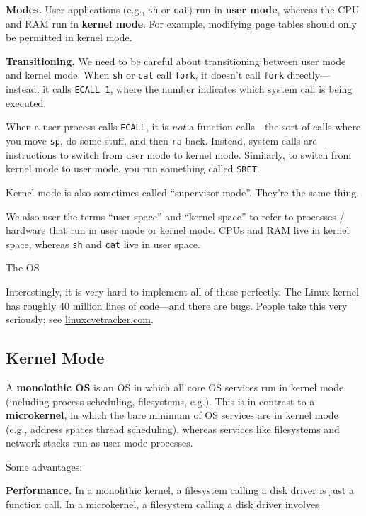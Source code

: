 \textbf{Modes.}
User applications (e.g., \verb|sh| or \verb|cat|) run in \textbf{user mode},
whereas the CPU and RAM run in \textbf{kernel mode}.
For example, modifying page tables should only be permitted in kernel mode.

\textbf{Transitioning.}
We need to be careful about transitioning between user mode and kernel mode.
When \verb|sh| or \verb|cat| call \verb|fork|,
it doesn't call \verb|fork| directly---instead, it calls
\verb|ECALL 1|, where the number indicates which system call is being executed.

When a user process calls \verb|ECALL|, it is \emph{not} a function calls---the
sort of calls where you move \verb|sp|, do some stuff, and then \verb|ra| back.
Instead, system calls are instructions to switch from user mode to kernel mode.
Similarly, to switch from kernel mode to user mode,
you run something called \verb|SRET|.

\begin{remark}
    Kernel mode is also sometimes called ``supervisor mode''.
    They're the same thing.

    We also user the terms ``user space'' and ``kernel space''
    to refer to processes / hardware that run in
    user mode or kernel mode.
    CPUs and RAM live in kernel space,
    whereas \verb|sh| and \verb|cat| live in user space.

    The OS 
\end{remark}

Interestingly, it is very hard to implement all of these perfectly.
The Linux kernel has roughly 40 million lines of code---and there are bugs.
People take this very seriously;
see \href{linuxcvetracker.com}{linuxcvetracker.com}.

\subsection{Kernel Mode}

A \textbf{monolothic OS} is an OS in which
all core OS services run in kernel mode
(including process scheduling, filesystems, e.g.).
This is in contrast to a \textbf{microkernel},
in which the bare minimum of OS services are in kernel mode
(e.g., address spaces thread scheduling),
whereas services like filesystems and network stacks
run as user-mode processes.

Some advantages:

\textbf{Performance.}
In a monolithic kernel,
a filesystem calling a disk driver is just a function call.
In a microkernel,
a filesystem calling a disk driver
involves 

